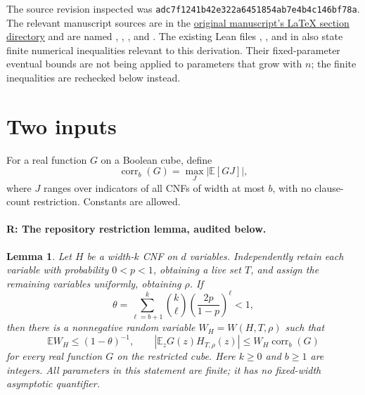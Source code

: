 \documentclass[11pt]{article}
\newtheorem{lemma}{Lemma}
\newcommand{\E}{\mathbb E}
\newcommand{\corr}{\operatorname{corr}}
\begin{document}
The source revision inspected was
\texttt{adc7f1241b42e322a6451854ab7e4b4c146bf78a}.
The relevant manuscript sources are in the
\href{https://github.com/openai/math/tree/adc7f1241b42e322a6451854ab7e4b4c146bf78a/preprints/Beyond-the-Square-Root-Exponent-for-Depth-Three-Boolean-Circuits-September-23-2026/build/latex/sections}{original manuscript's LaTeX section directory}
and are named
, ,
, and .
The existing Lean files ,
, and 
in 
also state finite numerical inequalities relevant to this derivation.
Their fixed-parameter eventual bounds are not being applied to parameters
that grow with $n$; the finite inequalities are rechecked below instead.

\section{Two inputs}

For a real function $G$ on a Boolean cube, define
\[
 \corr_b(G)=\max_{J}\left|\E[GJ]\right|,
\]
where $J$ ranges over indicators of all CNFs of width at most $b$,
with no clause-count restriction. Constants are allowed.

\paragraph{R: The repository restriction lemma, audited below.}
\begin{lemma}\label{lem:restriction}
Let $H$ be a width-$k$ CNF on $d$ variables. Independently retain each
variable with probability $0<p<1$, obtaining a live set $T$, and assign the
remaining variables uniformly, obtaining $\rho$. If
\[
 \theta=\sum_{\ell=b+1}^{k}\binom{k}{\ell}
                   \left(\frac{2p}{1-p}\right)^\ell<1,
\]
then there is a nonnegative random variable $W_H=W(H,T,\rho)$ such that
\[
 \E W_H\le(1-\theta)^{-1},\qquad
 |\E_z G(z)H_{T,\rho}(z)|\le W_H\corr_b(G)
\]
for every real function $G$ on the restricted cube. Here $k\ge0$ and
$b\ge1$ are integers. All parameters in this statement are finite; it has
no fixed-width asymptotic quantifier.
\end{lemma}
\end{document}
